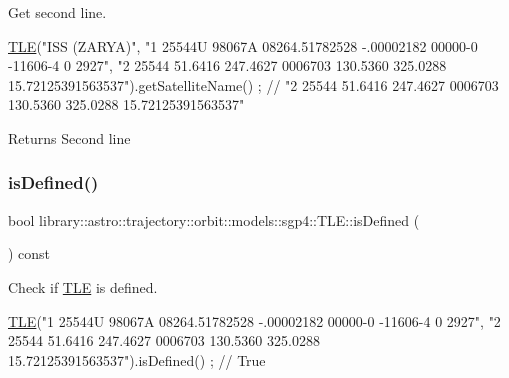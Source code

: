 Get second line. 


\begin{DoxyCode}
\hyperlink{classlibrary_1_1astro_1_1trajectory_1_1orbit_1_1models_1_1sgp4_1_1_t_l_e_a4d2b43f02cef44f0c9635daf9946261c}{TLE}(\textcolor{stringliteral}{"ISS (ZARYA)"},
    \textcolor{stringliteral}{"1 25544U 98067A   08264.51782528 -.00002182  00000-0 -11606-4 0  2927"},
    \textcolor{stringliteral}{"2 25544  51.6416 247.4627 0006703 130.5360 325.0288 15.72125391563537"}).getSatelliteName() ; \textcolor{comment}{// "2
       25544  51.6416 247.4627 0006703 130.5360 325.0288 15.72125391563537"}
\end{DoxyCode}


\begin{DoxyReturn}{Returns}
Second line 
\end{DoxyReturn}
\mbox{\label{classlibrary_1_1astro_1_1trajectory_1_1orbit_1_1models_1_1sgp4_1_1_t_l_e_a5098ce1a95f5bcab8398abcf5f3c7101}} 
\subsubsection{\texorpdfstring{is\+Defined()}{isDefined()}}
{\footnotesize\ttfamily bool library\+::astro\+::trajectory\+::orbit\+::models\+::sgp4\+::\+T\+L\+E\+::is\+Defined (\begin{DoxyParamCaption}{ }\end{DoxyParamCaption}) const}



Check if \hyperlink{classlibrary_1_1astro_1_1trajectory_1_1orbit_1_1models_1_1sgp4_1_1_t_l_e}{T\+LE} is defined. 


\begin{DoxyCode}
\hyperlink{classlibrary_1_1astro_1_1trajectory_1_1orbit_1_1models_1_1sgp4_1_1_t_l_e_a4d2b43f02cef44f0c9635daf9946261c}{TLE}(\textcolor{stringliteral}{"1 25544U 98067A   08264.51782528 -.00002182  00000-0 -11606-4 0  2927"},
    \textcolor{stringliteral}{"2 25544  51.6416 247.4627 0006703 130.5360 325.0288 15.72125391563537"}).isDefined() ; \textcolor{comment}{// True}
\end{DoxyCode}


